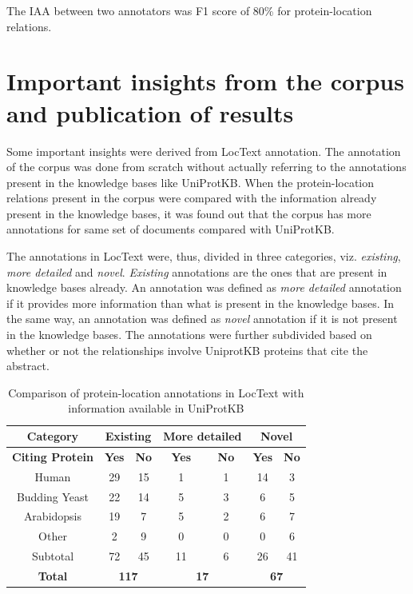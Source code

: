 The IAA between two annotators was F1 score of 80\% for protein-location relations.

\section{Important insights from the corpus and publication of results}

Some important insights were derived from LocText annotation. The annotation of the corpus was done from scratch without actually referring to the annotations present in the knowledge bases like UniProtKB. When the protein-location relations present in the corpus were compared with the information already present in the knowledge bases, it was found out that the corpus has more annotations for same set of documents compared with UniProtKB.

The annotations in LocText were, thus, divided in three categories, viz. \textit{existing}, \textit{more detailed} and \textit{novel}. \textit{Existing} annotations are the ones that are present in knowledge bases already. An annotation was defined as \textit{more detailed} annotation if it provides more information than what is present in the knowledge bases. In the same way, an annotation was defined as \textit{novel} annotation if it is not present in the knowledge bases. The annotations were further subdivided based on whether or not the relationships involve UniprotKB proteins that cite the abstract.

\begin{table}
\centering
\begin{tabular}{|c|c|c|c|c|c|c|}
\hline
\textbf{Category} & \multicolumn{2}{c|}{\textbf{Existing}} & \multicolumn{2}{c|}{\textbf{More detailed}} & \multicolumn{2}{c|}{\textbf{Novel}} \\ 
\hline
\textbf{Citing Protein} & \textbf{Yes} & \textbf{No} & \textbf{Yes} & \textbf{No} & \textbf{Yes} & \textbf{No} \\
\hline
Human & 29 & 15 & 1 & 1 & 14 & 3 \\
Budding Yeast & 22 & 14 & 5 & 3 & 6 & 5 \\
Arabidopsis & 19 & 7 & 5 & 2 & 6 & 7 \\
Other & 2 & 9 & 0 & 0 & 0 & 6 \\
\hline
Subtotal & 72 & 45 & 11 & 6 & 26 & 41 \\
\hline
\textbf{Total} & \multicolumn{2}{c|}{\textbf{117}} & \multicolumn{2}{c|}{\textbf{17}} & \multicolumn{2}{c|}{\textbf{67}} \\ 
 \hline
\end{tabular}
\caption{Comparison of protein-location annotations in LocText with information available in UniProtKB}\label{tab:novelAnnotation}
\end{table}

